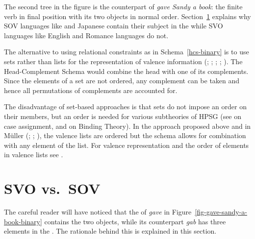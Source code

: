 \documentclass[output=paper
                ,modfonts
                ,nonflat
	        ,collection
	        ,collectionchapter
	        ,collectiontoclongg
 	        ,biblatex
                ,babelshorthands
                ,newtxmath
                ,draftmode
                ,colorlinks, citecolor=brown
]{./langsci/langscibook}
\begin{document}
The second tree in the figure is the  counterpart of \emph{gave Sandy a book}: the finite verb
in final position with its two objects in normal order. Section~\ref{sec-svo-sov} explains why SOV
languages like  and Japanese contain their subject in the \compsl while SVO languages like
English and Romance languages do not.

The alternative to using relational constraints as in Schema~\ref{hcs-binary} is to use sets rather
than lists for the representation of valence information
(\citealp[Section~4]{Gunji86a}; \citealp[]{HN89a}; \citealp[]{Pollard90a-Eng};
\citealp[]{Oliva92b}; \citealp*[]{EEU92a}). The Head-Complement Schema would combine the head with
one of its complements. Since the elements of a set are not ordered, any complement can be taken and
hence all permutations of complements are accounted for.

The disadvantage of set-based approaches is that sets do
not impose an order on their members, but an order is needed for various subtheories of HPSG (see
 on case assignment, and  on Binding Theory). In
the approach proposed above and in Müller (\citeyear[]{Mueller2005c}; \citeyear[]{MuellerHPSGHandbook}; \citeyear[--54]{MuellerCoreGram}), the valence lists are
ordered but the schema allows for combination with any element of the list. For valence
representation and the order of elements in valence lists see .


\section{SVO vs.\ SOV}
\label{sec-svo-sov}

The careful reader will have noticed that the \compsl of \emph{gave} in Figure~\ref{fig-gave-sandy-a-book-binary} contains the
two objects, while its  counterpart \emph{gab} has three elements in the \compsl. The
rationale behind this is explained in this section.
\end{document}
